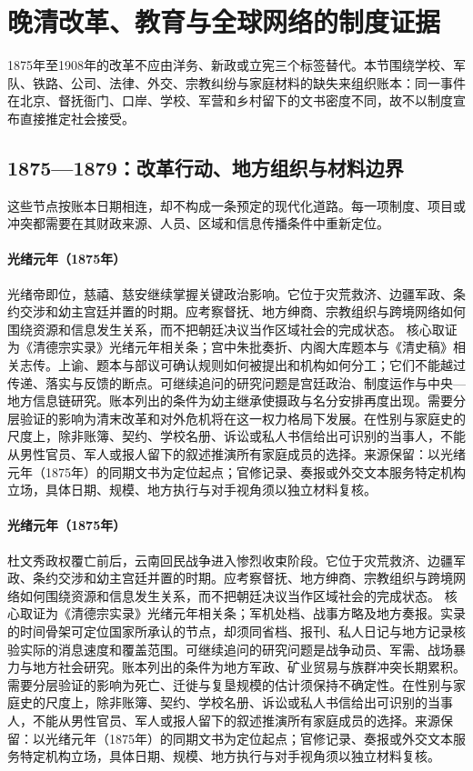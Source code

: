 \section{晚清改革、教育与全球网络的制度证据}
1875年至1908年的改革不应由洋务、新政或立宪三个标签替代。本节围绕学校、军队、铁路、公司、法律、外交、宗教纠纷与家庭材料的缺失来组织账本：同一事件在北京、督抚衙门、口岸、学校、军营和乡村留下的文书密度不同，故不以制度宣布直接推定社会接受。
\subsection{1875—1879：改革行动、地方组织与材料边界}
这些节点按账本日期相连，却不构成一条预定的现代化道路。每一项制度、项目或冲突都需要在其财政来源、人员、区域和信息传播条件中重新定位。
\hypertarget{public:EQ-1875-GUANGXU-ACCESSION}{}\paragraph{光绪元年（1875年）}光绪帝即位，慈禧、慈安继续掌握关键政治影响。它位于灾荒救济、边疆军政、条约交涉和幼主宫廷并置的时期。应考察督抚、地方绅商、宗教组织与跨境网络如何围绕资源和信息发生关系，而不把朝廷决议当作区域社会的完成状态。 核心取证为《清德宗实录》光绪元年相关条；宫中朱批奏折、内阁大库题本与《清史稿》相关志传。上谕、题本与部议可确认规则如何被提出和机构如何分工；它们不能越过传递、落实与反馈的断点。可继续追问的研究问题是宫廷政治、制度运作与中央—地方信息链研究。账本列出的条件为幼主继承使摄政与名分安排再度出现。需要分层验证的影响为清末改革和对外危机将在这一权力格局下发展。在性别与家庭史的尺度上，除非账簿、契约、学校名册、诉讼或私人书信给出可识别的当事人，不能从男性官员、军人或报人留下的叙述推演所有家庭成员的选择。来源保留：以光绪元年（1875年）的同期文书为定位起点；官修记录、奏报或外交文本服务特定机构立场，具体日期、规模、地方执行与对手视角须以独立材料复核。
\hypertarget{public:EQ-1875-YUNNAN-MUSLIM-WAR}{}\paragraph{光绪元年（1875年）}杜文秀政权覆亡前后，云南回民战争进入惨烈收束阶段。它位于灾荒救济、边疆军政、条约交涉和幼主宫廷并置的时期。应考察督抚、地方绅商、宗教组织与跨境网络如何围绕资源和信息发生关系，而不把朝廷决议当作区域社会的完成状态。 核心取证为《清德宗实录》光绪元年相关条；军机处档、战事方略及地方奏报。实录的时间骨架可定位国家所承认的节点，却须同省档、报刊、私人日记与地方记录核验实际的消息速度和覆盖范围。可继续追问的研究问题是战争动员、军需、战场暴力与地方社会研究。账本列出的条件为地方军政、矿业贸易与族群冲突长期累积。需要分层验证的影响为死亡、迁徙与复垦规模的估计须保持不确定性。在性别与家庭史的尺度上，除非账簿、契约、学校名册、诉讼或私人书信给出可识别的当事人，不能从男性官员、军人或报人留下的叙述推演所有家庭成员的选择。来源保留：以光绪元年（1875年）的同期文书为定位起点；官修记录、奏报或外交文本服务特定机构立场，具体日期、规模、地方执行与对手视角须以独立材料复核。
